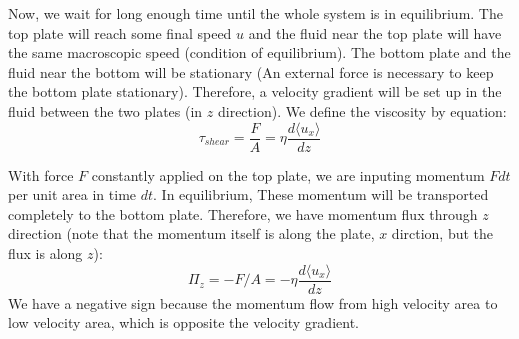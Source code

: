 \documentclass{article}
\begin{document}
Now, we wait for long enough time until the whole system is in equilibrium. The top plate will reach some final speed $u$ and 
the fluid near the top plate will have the same macroscopic speed (condition of equilibrium). The bottom plate and the fluid near the bottom 
will be stationary (An external force is necessary to keep the bottom plate stationary). 
Therefore, a velocity gradient will be set up in the fluid between the two plates (in $z$ direction). We define 
the viscosity by equation:
\begin{equation}
    \tau_{shear} = \frac{F}{A} = \eta \frac{d \langle u_x \rangle}{dz}
\end{equation}

With force $F$ constantly applied on the top plate, we are inputing momentum $Fdt$ per unit area in time $dt$. In equilibrium, 
These momentum will be transported completely to the bottom plate. Therefore, we have momentum flux through $z$ direction 
(note that the momentum itself is along the plate, $x$ dirction, but the flux is along $z$):
\begin{equation}
    \Pi_z = - F / A = - \eta \frac{d \langle u_x \rangle}{dz}
\end{equation}
We have a negative sign because the momentum flow from high velocity area to low velocity area, which is opposite the velocity gradient.
\end{document}
